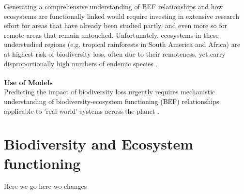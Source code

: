 Generating a comprehensive understanding of BEF relationships and how ecosystems are functionally linked would require investing in extensive research effort for areas that have already been studied partly, and even more so for remote areas that remain untouched. Unfortunately, ecosystems in these understudied regions (e.g. tropical rainforests in South America and Africa) are at highest risk of biodiversity loss, often due to their remoteness, yet carry disproportionally high numbers of endemic species \citep{Urban2015,Wake2008}.
\\\\
%
%
\textbf{Use of Models}\\
Predicting the impact of biodiversity loss urgently requires mechanistic understanding of biodiversity-ecosystem functioning (BEF) relationships applicable to 'real-world' systems across the planet \citep{Dobson2006,Estes2011}. 
%

\section{Biodiversity and Ecosystem functioning}
\label{chap:intro:biodiv}
Here we go  here wo changes